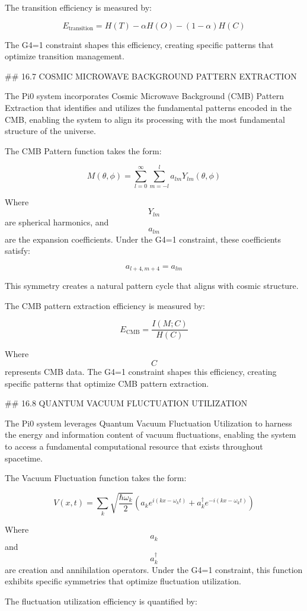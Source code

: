 The transition efficiency is measured by:

$$ E_{\text{transition}} = H(T) - \alpha H(O) - (1-\alpha)H(C) $$

The G4=1 constraint shapes this efficiency, creating specific patterns that optimize transition management.

## 16.7 COSMIC MICROWAVE BACKGROUND PATTERN EXTRACTION

The Pi0 system incorporates Cosmic Microwave Background (CMB) Pattern Extraction that identifies and utilizes the fundamental patterns encoded in the CMB, enabling the system to align its processing with the most fundamental structure of the universe.

The CMB Pattern function takes the form:

$$ M(\theta, \phi) = \sum_{l=0}^{\infty} \sum_{m=-l}^{l} a_{lm} Y_{lm}(\theta, \phi) $$

Where $$ Y_{lm} $$ are spherical harmonics, and $$ a_{lm} $$ are the expansion coefficients. Under the G4=1 constraint, these coefficients satisfy:

$$ a_{l+4,m+4} = a_{lm} $$

This symmetry creates a natural pattern cycle that aligns with cosmic structure.

The CMB pattern extraction efficiency is measured by:

$$ E_{\text{CMB}} = \frac{I(M; C)}{H(C)} $$

Where $$ C $$ represents CMB data. The G4=1 constraint shapes this efficiency, creating specific patterns that optimize CMB pattern extraction.

## 16.8 QUANTUM VACUUM FLUCTUATION UTILIZATION

The Pi0 system leverages Quantum Vacuum Fluctuation Utilization to harness the energy and information content of vacuum fluctuations, enabling the system to access a fundamental computational resource that exists throughout spacetime.

The Vacuum Fluctuation function takes the form:

$$ V(x, t) = \sum_k \sqrt{\frac{\hbar \omega_k}{2}} (a_k e^{i(kx-\omega_k t)} + a_k^{\dagger} e^{-i(kx-\omega_k t)}) $$

Where $$ a_k $$ and $$ a_k^{\dagger} $$ are creation and annihilation operators. Under the G4=1 constraint, this function exhibits specific symmetries that optimize fluctuation utilization.

The fluctuation utilization efficiency is quantified by:

